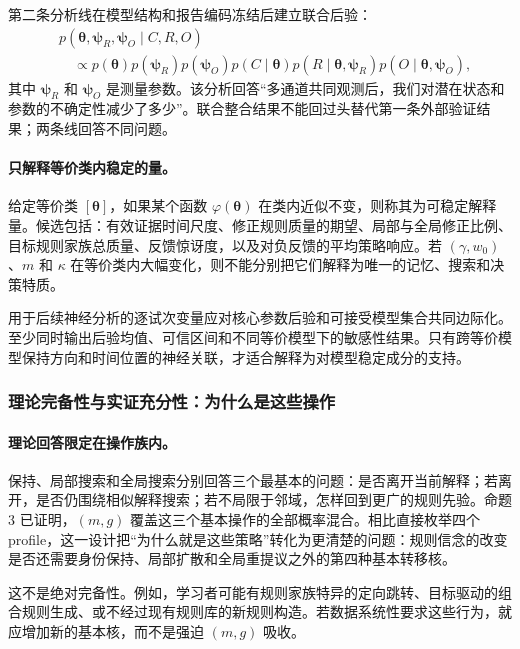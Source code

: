 第二条分析线在模型结构和报告编码冻结后建立联合后验：
\begin{align}
    &p(\boldsymbol\theta,
      \boldsymbol\psi_R,\boldsymbol\psi_O
      \mid C,R,O)\nonumber\\
    &\quad\propto
      p(\boldsymbol\theta)
      p(\boldsymbol\psi_R)p(\boldsymbol\psi_O)
      p(C\mid\boldsymbol\theta)
      p(R\mid\boldsymbol\theta,\boldsymbol\psi_R)
      p(O\mid\boldsymbol\theta,\boldsymbol\psi_O),
    \label{eq:model0803-joint-posterior}
\end{align}
其中 $\boldsymbol\psi_R$ 和 $\boldsymbol\psi_O$ 是测量参数。该分析回答“多通道共同观测后，我们对潜在状态和参数的不确定性减少了多少”。联合整合结果不能回过头替代第一条外部验证结果；两条线回答不同问题。

\paragraph{只解释等价类内稳定的量。}
给定等价类 $[\boldsymbol\theta]$，如果某个函数 $\varphi(\boldsymbol\theta)$ 在类内近似不变，则称其为可稳定解释量。候选包括：有效证据时间尺度、修正规则质量的期望、局部与全局修正比例、目标规则家族总质量、反馈惊讶度，以及对负反馈的平均策略响应。若 $(\gamma,w_0)$、$m$ 和 $\kappa$ 在等价类内大幅变化，则不能分别把它们解释为唯一的记忆、搜索和决策特质。

用于后续神经分析的逐试次变量应对核心参数后验和可接受模型集合共同边际化。至少同时输出后验均值、可信区间和不同等价模型下的敏感性结果。只有跨等价模型保持方向和时间位置的神经关联，才适合解释为对模型稳定成分的支持。


\subsubsection{理论完备性与实证充分性：为什么是这些操作}

\paragraph{理论回答限定在操作族内。}
保持、局部搜索和全局搜索分别回答三个最基本的问题：是否离开当前解释；若离开，是否仍围绕相似解释搜索；若不局限于邻域，怎样回到更广的规则先验。命题 3 已证明，$(m,g)$ 覆盖这三个基本操作的全部概率混合。相比直接枚举四个 profile，这一设计把“为什么就是这些策略”转化为更清楚的问题：规则信念的改变是否还需要身份保持、局部扩散和全局重提议之外的第四种基本转移核。

这不是绝对完备性。例如，学习者可能有规则家族特异的定向跳转、目标驱动的组合规则生成、或不经过现有规则库的新规则构造。若数据系统性要求这些行为，就应增加新的基本核，而不是强迫 $(m,g)$ 吸收。

